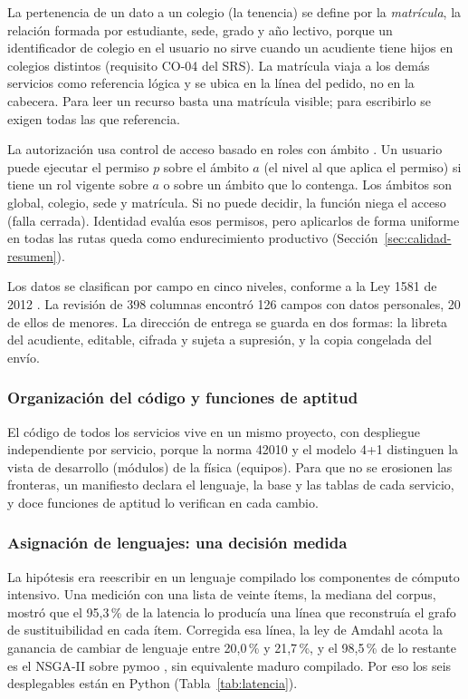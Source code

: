 La pertenencia de un dato a un colegio (la tenencia) se define por la \emph{matrícula}, la relación formada por estudiante, sede, grado y año lectivo, porque un identificador de colegio en el usuario no sirve cuando un acudiente tiene hijos en colegios distintos (requisito CO-04 del SRS). La matrícula viaja a los demás servicios como referencia lógica y se ubica en la línea del pedido, no en la cabecera. Para leer un recurso basta una matrícula visible; para escribirlo se exigen todas las que referencia.

La autorización usa control de acceso basado en roles con ámbito \citep{sandhu_role-based_1996}. Un usuario puede ejecutar el permiso $p$ sobre el ámbito $a$ (el nivel al que aplica el permiso) si tiene un rol vigente sobre $a$ o sobre un ámbito que lo contenga. Los ámbitos son global, colegio, sede y matrícula. Si no puede decidir, la función niega el acceso (falla cerrada). Identidad evalúa esos permisos, pero aplicarlos de forma uniforme en todas las rutas queda como endurecimiento productivo (Sección~\ref{sec:calidad-resumen}).

Los datos se clasifican por campo en cinco niveles, conforme a la Ley 1581 de 2012 \citep{congreso_ley1581_2012}. La revisión de 398 columnas encontró 126 campos con datos personales, 20 de ellos de menores. La dirección de entrega se guarda en dos formas: la libreta del acudiente, editable, cifrada y sujeta a supresión, y la copia congelada del envío.

\subsubsection{Organización del código y funciones de aptitud}
\label{sec:monorepo}

El código de todos los servicios vive en un mismo proyecto, con despliegue independiente por servicio, porque la norma 42010 y el modelo 4+1 distinguen la vista de desarrollo (módulos) de la física (equipos). Para que no se erosionen las fronteras, un manifiesto declara el lenguaje, la base y las tablas de cada servicio, y doce funciones de aptitud \citep{ford_building_2017} lo verifican en cada cambio.

\subsubsection{Asignación de lenguajes: una decisión medida}
\label{sec:lenguajes}

La hipótesis era reescribir en un lenguaje compilado los componentes de cómputo intensivo. Una medición con una lista de veinte ítems, la mediana del corpus, mostró que el 95,3\,\% de la latencia lo producía una línea que reconstruía el grafo de sustituibilidad en cada ítem. Corregida esa línea, la ley de Amdahl \citep{amdahl_validity_1967} acota la ganancia de cambiar de lenguaje entre 20,0\,\% y 21,7\,\%, y el 98,5\,\% de lo restante es el NSGA-II sobre pymoo \citep{blank_pymoo_2020}, sin equivalente maduro compilado. Por eso los seis desplegables están en Python (Tabla~\ref{tab:latencia}).


